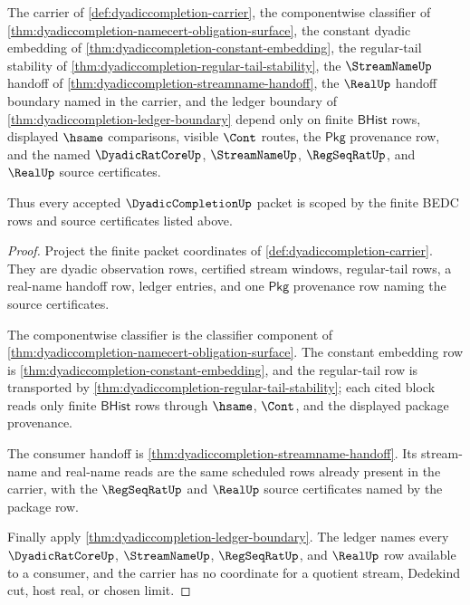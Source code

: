\begin{theorem}
\label{thm:dyadiccompletion-scoped-dependency-packet}
The carrier of \autoref{def:dyadiccompletion-carrier}, the componentwise
classifier of
\autoref{thm:dyadiccompletion-namecert-obligation-surface}, the constant dyadic
embedding of \autoref{thm:dyadiccompletion-constant-embedding}, the
regular-tail stability of
\autoref{thm:dyadiccompletion-regular-tail-stability}, the $\StreamNameUp$
handoff of \autoref{thm:dyadiccompletion-streamname-handoff}, the $\RealUp$
handoff boundary named in the carrier, and the ledger boundary of
\autoref{thm:dyadiccompletion-ledger-boundary} depend only on finite
$\mathsf{BHist}$ rows, displayed $\hsame$ comparisons, visible $\Cont$ routes,
the $\mathsf{Pkg}$ provenance row, and the named $\DyadicRatCoreUp$,
$\StreamNameUp$, $\RegSeqRatUp$, and $\RealUp$ source certificates.

Thus every accepted $\DyadicCompletionUp$ packet is scoped by the finite BEDC
rows and source certificates listed above.
\end{theorem}
\begin{proof}
Project the finite packet coordinates of
\autoref{def:dyadiccompletion-carrier}. They are dyadic observation rows,
certified stream windows, regular-tail rows, a real-name handoff row, ledger
entries, and one $\mathsf{Pkg}$ provenance row naming the source certificates.

The componentwise classifier is the classifier component of
\autoref{thm:dyadiccompletion-namecert-obligation-surface}. The constant
embedding row is \autoref{thm:dyadiccompletion-constant-embedding}, and the
regular-tail row is transported by
\autoref{thm:dyadiccompletion-regular-tail-stability}; each cited block reads
only finite $\mathsf{BHist}$ rows through $\hsame$, $\Cont$, and the displayed
package provenance.

The consumer handoff is \autoref{thm:dyadiccompletion-streamname-handoff}. Its
stream-name and real-name reads are the same scheduled rows already present in
the carrier, with the $\RegSeqRatUp$ and $\RealUp$ source certificates named by
the package row.

Finally apply \autoref{thm:dyadiccompletion-ledger-boundary}. The ledger names
every $\DyadicRatCoreUp$, $\StreamNameUp$, $\RegSeqRatUp$, and $\RealUp$ row
available to a consumer, and the carrier has no coordinate for a quotient
stream, Dedekind cut, host real, or chosen limit.
\end{proof}


